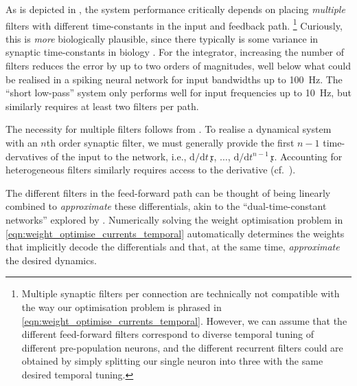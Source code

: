 As is depicted in , the system performance critically depends on placing \emph{multiple} filters with different time-constants in the input and feedback path.%
\footnote{Multiple synaptic filters per connection are technically not compatible with the way our optimisation problem is phrased in \cref{eqn:weight_optimise_currents_temporal}.
However, we can assume that the different feed-forward filters correspond to diverse temporal tuning of different pre-population neurons, and the different recurrent filters could are obtained by simply splitting our single neuron into three with the same desired temporal tuning.}
Curiously, this is \emph{more} biologically plausible, since there typically is some variance in synaptic time-constants in biology \citep{jones2014neurotransmitter}.
For the integrator, increasing the number of filters reduces the error by up to two orders of magnitudes, well below what could be realised in a spiking neural network for input bandwidths up to \SI{100}{\hertz}.
The \enquote{short low-pass} system only performs well for input frequencies up to \SI{10}{\hertz}, but similarly requires at least two filters per path.

The necessity for multiple filters follows from \citet[Section~4.4, p.~591]{voelker2018improving}.
To realise a dynamical system with an $n$th order synaptic filter, we must generally provide the first $n - 1$ time-dervatives of the input to the network, i.e., $\mathrm{d} / \mathrm{d} t \, \mathfrak{x}$, $\ldots$, $\mathrm{d} / \mathrm{d} t^{n - 1} \, \mathfrak{x}$.
Accounting for heterogeneous filters similarly requires access to the derivative (cf.~).

The different filters in the feed-forward path can be thought of being linearly combined to \emph{approximate} these differentials, akin to the \enquote{dual-time-constant networks} explored by \citet{tripp2010population}.
Numerically solving the weight optimisation problem in \cref{eqn:weight_optimise_currents_temporal} automatically determines the weights that implicitly decode the differentials and that, at the same time, \emph{approximate} the desired dynamics.

